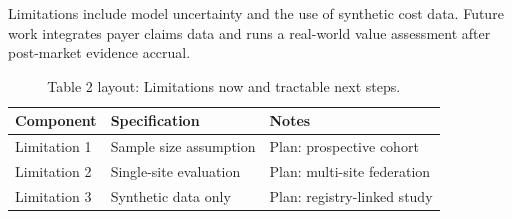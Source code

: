 
Limitations include model uncertainty and the use of synthetic cost data. Future work integrates payer claims data and runs a real-world value assessment after post-market evidence accrual.

\begin{table}[H]
\caption{Table 2 layout: Limitations now and tractable next steps.}
\label{tab:limits_future}
\centering
\begin{tabular}{>{\raggedright\arraybackslash}p{3.4cm} >{\raggedright\arraybackslash}p{4.6cm} >{\raggedright\arraybackslash}p{5.4cm}}
\toprule
\textbf{Component} & \textbf{Specification} & \textbf{Notes} \\
\midrule
  Limitation 1 & Sample size assumption & Plan: prospective cohort \\
  Limitation 2 & Single-site evaluation & Plan: multi-site federation \\
  Limitation 3 & Synthetic data only & Plan: registry-linked study \\
\bottomrule
\end{tabular}
\end{table}
